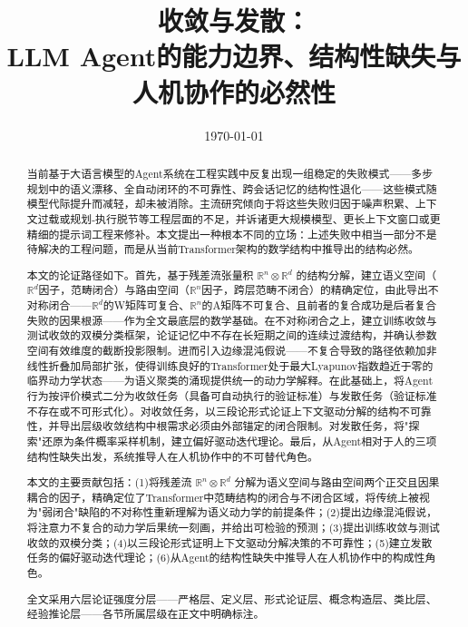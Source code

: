 \documentclass[11pt,a4paper]{article}
\title{{\bfseries 收敛与发散：\\LLM Agent的能力边界、结构性缺失与人机协作的必然性}}
\author{}
\date{\today}
\theoremstyle{definition}
\begin{document}
\maketitle

\begin{abstract}
\noindent
当前基于大语言模型的Agent系统在工程实践中反复出现一组稳定的失败模式——多步规划中的语义漂移、全自动闭环的不可靠性、跨会话记忆的结构性退化——这些模式随模型代际提升而减轻，却未被消除。主流研究倾向于将这些失败归因于噪声积累、上下文过载或规划-执行脱节等工程层面的不足，并诉诸更大规模模型、更长上下文窗口或更精细的提示词工程来修补。本文提出一种根本不同的立场：上述失败中相当一部分不是待解决的工程问题，而是从当前Transformer架构的数学结构中推导出的结构必然。

本文的论证路径如下。首先，基于残差流张量积 $\mathbb{R}^n \otimes \mathbb{R}^d$ 的结构分解，建立语义空间（$\mathbb{R}^d$因子，范畴闭合）与路由空间（$\mathbb{R}^n$因子，跨层范畴不闭合）的精确定位，由此导出不对称闭合——$\mathbb{R}^d$的W矩阵可复合、$\mathbb{R}^n$的A矩阵不可复合、且前者的复合成功是后者复合失败的因果根源——作为全文最底层的数学基础。在不对称闭合之上，建立训练收敛与测试收敛的双模分类框架，论证记忆中不存在长短期之间的连续过渡结构，并确认参数空间有效维度的截断投影限制。进而引入边缘混沌假说——不复合导致的路径依赖加非线性折叠加局部扩张，使得训练良好的Transformer处于最大Lyapunov指数趋近于零的临界动力学状态——为语义聚类的涌现提供统一的动力学解释。在此基础上，将Agent行为按评价模式二分为收敛任务（具备可自动执行的验证标准）与发散任务（验证标准不存在或不可形式化）。对收敛任务，以三段论形式论证上下文驱动分解的结构不可靠性，并导出层级收敛结构中根需求必须由外部锚定的闭合限制。对发散任务，将"探索"还原为条件概率采样机制，建立偏好驱动迭代理论。最后，从Agent相对于人的三项结构性缺失出发，系统推导人在人机协作中的不可替代角色。

本文的主要贡献包括：(1)将残差流 $\mathbb{R}^n \otimes \mathbb{R}^d$ 分解为语义空间与路由空间两个正交且因果耦合的因子，精确定位了Transformer中范畴结构的闭合与不闭合区域，将传统上被视为"弱闭合"缺陷的不对称性重新理解为语义动力学的前提条件；(2)提出边缘混沌假说，将注意力不复合的动力学后果统一刻画，并给出可检验的预测；(3)提出训练收敛与测试收敛的双模分类；(4)以三段论形式证明上下文驱动分解决策的不可靠性；(5)建立发散任务的偏好驱动迭代理论；(6)从Agent的结构性缺失中推导人在人机协作中的构成性角色。

全文采用六层论证强度分层——严格层、定义层、形式论证层、概念构造层、类比层、经验推论层——各节所属层级在正文中明确标注。
\end{abstract}

\newpage
\tableofcontents
\newpage
\end{document}
